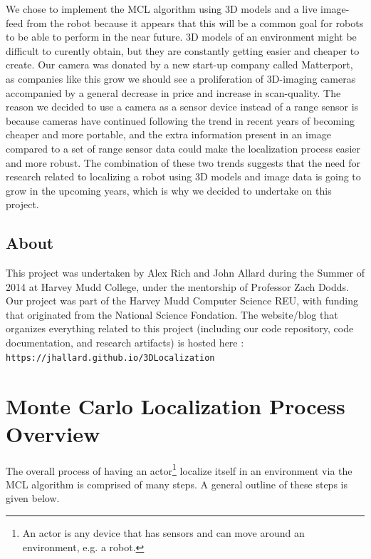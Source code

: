 \documentclass[a4paper,11pt]{article}
\begin{document}
 We chose to implement the MCL algorithm using 3D models and a live image-feed from the robot because it appears that this will be a common goal for robots to be able to perform in the near future. 3D models of an environment might be difficult to curently obtain, but they are constantly getting easier and cheaper to create. Our camera was donated by a new start-up company called Matterport, as companies like this grow we should see a proliferation of 3D-imaging cameras accompanied by a general decrease in price and increase in scan-quality. The reason we decided to use a camera as a sensor device instead of a range sensor is because cameras have continued following the trend in recent years of becoming cheaper and more portable, and the extra information present in an image compared to a set of range sensor data could make the localization process easier and more robust. The combination of these two trends suggests that the need for research related to localizing a robot using 3D models and image data is going to grow in the upcoming years, which is why we decided to undertake on this project.

 \subsection{About}
 This project was undertaken by Alex Rich and John Allard during the Summer of 2014 at Harvey Mudd College, under the mentorship of Professor Zach Dodds. Our project was part of the Harvey Mudd Computer Science REU, with funding that originated from the National Science Fondation. The website/blog that organizes everything related to this project (including our code repository, code documentation, and research artifacts) is hosted here : \\
\texttt{https://jhallard.github.io/3DLocalization}

\newpage

  \section{Monte Carlo Localization Process Overview}

The overall process of having an actor\footnote{An actor is any device that has sensors and can move around an environment, e.g. a robot.} localize itself in an environment via the MCL algorithm is comprised of many steps. A general outline of these steps is given below.
\end{document}
